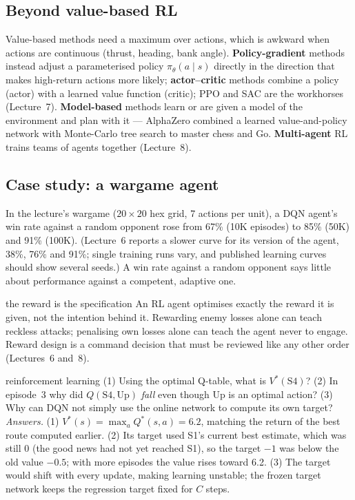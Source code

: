 \documentclass[11pt]{article}
\begin{document}
\subsection{Beyond value-based RL}
Value-based methods need a maximum over actions, which is awkward when actions are continuous (thrust, heading, bank angle). \textbf{Policy-gradient} methods instead adjust a parameterised policy $\pi_\theta(a\mid s)$ directly in the direction that makes high-return actions more likely; \textbf{actor--critic} methods combine a policy (actor) with a learned value function (critic); PPO and SAC are the workhorses (Lecture~7). \textbf{Model-based} methods learn or are given a model of the environment and plan with it --- AlphaZero combined a learned value-and-policy network with Monte-Carlo tree search to master chess and Go. \textbf{Multi-agent} RL trains teams of agents together (Lecture~8).

\subsection{Case study: a wargame agent}
In the lecture's wargame ($20\times20$ hex grid, 7 actions per unit), a DQN agent's win rate against a random opponent rose from 67\% (10K episodes) to 85\% (50K) and 91\% (100K). (Lecture~6 reports a slower curve for its version of the agent, 38\%, 76\% and 91\%; single training runs vary, and published learning curves should show several seeds.) A win rate against a random opponent says little about performance against a competent, adaptive one.
\begin{pitfall}{the reward is the specification}
An RL agent optimises exactly the reward it is given, not the intention behind it. Rewarding enemy losses alone can teach reckless attacks; penalising own losses alone can teach the agent never to engage. Reward design is a command decision that must be reviewed like any other order (Lectures~6 and~8).
\end{pitfall}
\begin{question}{reinforcement learning}
(1) Using the optimal Q-table, what is $V^*(\text{S4})$? (2) In episode~3 why did $Q(\text{S4},\text{Up})$ \emph{fall} even though Up is an optimal action? (3) Why can DQN not simply use the online network to compute its own target?\\
\textit{Answers.} (1) $V^*(s)=\max_aQ^*(s,a)=6.2$, matching the return of the best route computed earlier. (2) Its target used S1's current best estimate, which was still 0 (the good news had not yet reached S1), so the target $-1$ was below the old value $-0.5$; with more episodes the value rises toward 6.2. (3) The target would shift with every update, making learning unstable; the frozen target network keeps the regression target fixed for $C$ steps.
\end{question}
\end{document}
